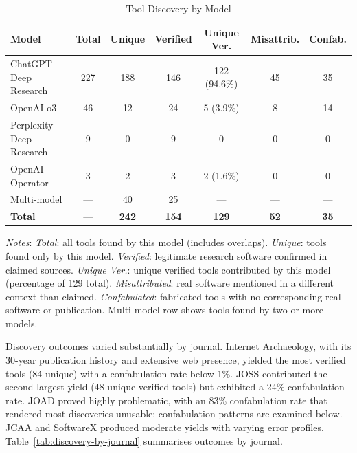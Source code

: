 \begin{table}[h]
\centering
\caption{Tool Discovery by Model}
\label{tab:discovery-by-model}
\begin{tabular}{lcccccc}
\toprule
\textbf{Model} & \textbf{Total} & \textbf{Unique} & \textbf{Verified} & \textbf{Unique Ver.} & \textbf{Misattrib.} & \textbf{Confab.} \\
\midrule
ChatGPT Deep Research & 227 & 188 & 146 & 122 (94.6\%) & 45 & 35 \\
OpenAI o3 & 46 & 12 & 24 & 5 (3.9\%) & 8 & 14 \\
Perplexity Deep Research & 9 & 0 & 9 & 0 & 0 & 0 \\
OpenAI Operator & 3 & 2 & 3 & 2 (1.6\%) & 0 & 0 \\
Multi-model & --- & 40 & 25 & --- & --- & --- \\
\midrule
\textbf{Total} & --- & \textbf{242} & \textbf{154} & \textbf{129} & \textbf{52} & \textbf{35} \\
\bottomrule
\end{tabular}
\smallskip
{\small \textit{Notes}: \textit{Total}: all tools found by this model (includes overlaps). \textit{Unique}: tools found only by this model. \textit{Verified}: legitimate research software confirmed in claimed sources. \textit{Unique Ver.}: unique verified tools contributed by this model (percentage of 129 total). \textit{Misattributed}: real software mentioned in a different context than claimed. \textit{Confabulated}: fabricated tools with no corresponding real software or publication. Multi-model row shows tools found by two or more models.}
\end{table}

Discovery outcomes varied substantially by journal. Internet Archaeology, with its 30-year publication history and extensive web presence, yielded the most verified tools (84 unique) with a confabulation rate below 1\%. JOSS contributed the second-largest yield (48 unique verified tools) but exhibited a 24\% confabulation rate. JOAD proved highly problematic, with an 83\% confabulation rate that rendered most discoveries unusable; confabulation patterns are examined below. JCAA and SoftwareX produced moderate yields with varying error profiles. Table~\ref{tab:discovery-by-journal} summarises outcomes by journal.

